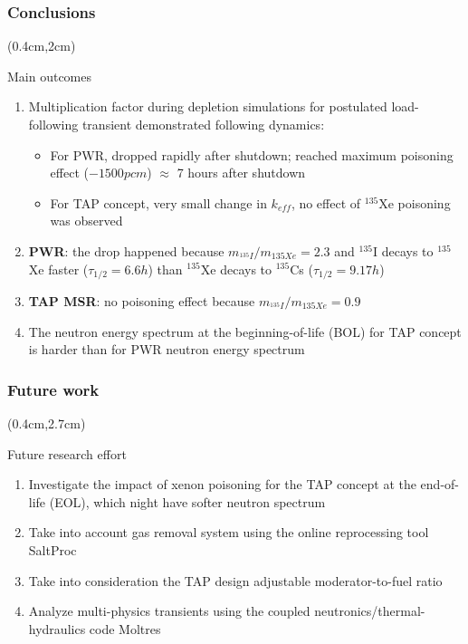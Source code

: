 \begin{frame}
\frametitle{Conclusions}
	\begin{textblock*}{12cm}(0.4cm,2cm) %
	\begin{block}{Main outcomes}
		\begin{enumerate}
			\itemsep=5mm
			\item Multiplication factor during depletion simulations for 
			postulated load-following transient demonstrated following 
			dynamics:
				\begin{itemize}
					\item For PWR, dropped rapidly after shutdown; reached 
					maximum poisoning effect ($-1500pcm$) $\approx$ 7 hours 
					after shutdown
					\item For \gls{TAP} concept, very small change in 
					$k_{eff}$, no effect of $^{135}$Xe poisoning was observed
				\end{itemize}
			\item \textbf{PWR}: the drop happened because 			
			$m_{^{135}I}/m_{{135}Xe} = 2.3$ and $^{135}$I decays to $^{135}$Xe 
			faster ($\tau_{1/2}=6.6h$) than $^{135}$Xe decays to $^{135}$Cs 
			($\tau_{1/2}=9.17h$)
			\item \textbf{\gls{TAP} \gls{MSR}}: no poisoning effect because 
			$m_{^{135}I}/m_{{135}Xe} = 0.9$
			\item The neutron energy spectrum at the beginning-of-life 
			(BOL) for \gls{TAP} concept is harder than for PWR
			neutron energy spectrum
		\end{enumerate}
	\end{block}


	\end{textblock*}
\end{frame}

\begin{frame}
\frametitle{Future work}
\begin{textblock*}{12cm}(0.4cm,2.7cm) %
	\begin{block}{Future research effort}
		\begin{enumerate}
		\itemsep=5mm
			\item Investigate the impact of xenon poisoning for the TAP 
			concept at the end-of-life (EOL), which night have softer neutron 
			spectrum
			\item Take into account gas removal system using the online 
			reprocessing tool SaltProc \cite{rykhlevskii_arfc/saltproc_2018, 
			rykhlevskii_modeling_2019}
			\item Take into consideration the \gls{TAP} design adjustable 
			moderator-to-fuel ratio
			\item Analyze multi-physics transients using the coupled 
			neutronics/thermal-hydraulics code Moltres 
			\cite{lindsay_introduction_2018}
		\end{enumerate}
	\end{block}
\end{textblock*}
\end{frame}

